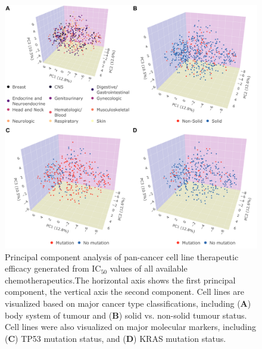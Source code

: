 \documentclass[10pt, letterpaper, twocolumn]{article}
\begin{document}
\begin{figure}[!ht]
	\centering
    \includegraphics[width=\textwidth]{Figures/initial_pca.png}

	\caption{Principal component analysis of pan-cancer cell line therapeutic efficacy generated from IC$_{50}$ values of all available chemotherapeutics.The horizontal axis shows the first principal component, the vertical axis the second component. Cell lines are visualized based on major cancer type classifications, including (\textbf{A}) body system of tumour and (\textbf{B}) solid vs. non-solid tumour status. Cell lines were also visualized on major molecular markers, including (\textbf{C}) TP53 mutation status, and (\textbf{D}) KRAS mutation status.}
	\label{fig:overall_pca}
\end{figure}
\end{document}

